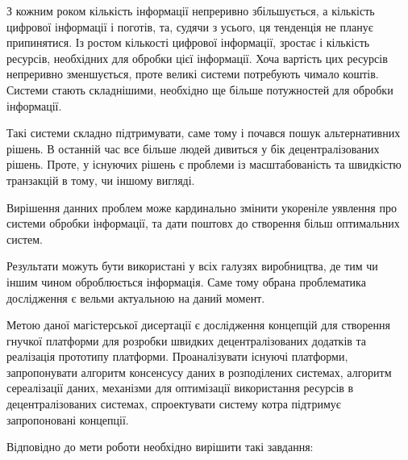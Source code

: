 \documentclass{lib/styles/default-style}
\begin{document}
\pagestyle{default-numbered}

\tableofcontents

\newpage



    З кожним роком кількість інформації непреривно збільшується, а кількість цифрової інформації і поготів,
    та, судячи з усього, ця тенденція не планує припинятися. Із ростом кількості цифрової інформації, зростає і
    кількість ресурсів, необхідних для обробки цієї інформації. Хоча вартість цих ресурсів непреривно зменшується,
    проте великі системи потребують чимало коштів. Системи стають складнішими, необхідно ще більше потужностей для обробки інформації.

    Такі системи складно підтримувати, саме тому і почався пошук альтернативних рішень. В останній час все більше людей дивиться у бік
    децентралізованих рішень. Проте, у існуючих рішень є проблеми із масштабованість та швидкістю транзакцій в тому, чи іншому вигляді.

    Вирішення данних проблем може кардинально змінити укореніле уявлення про системи обробки інформації, та дати поштовх до створення
    більш оптимальних систем.

    Результати можуть бути використані у всіх галузях виробництва, де тим чи іншим чином оброблюється інформація.
    Саме тому обрана проблематика дослідження є вельми актуальною на даний момент.

    Метою даної магістерської дисертації є дослідження концепцій для створення гнучкої платформи для розробки швидких децентралізованих додатків
    та реалізація прототипу платформи. Проаналізувати існуючі платформи, запропонувати алгоритм консенсусу  даних  в  розподілених  системах,
    алгоритм сереалізації даних, механізми для оптимізації використання ресурсів в децентралізованих системах,
    спроектувати  систему  котра  підтримує запропоновані концепції.

    Відповідно до мети роботи необхідно вирішити такі завдання:
\end{document}

